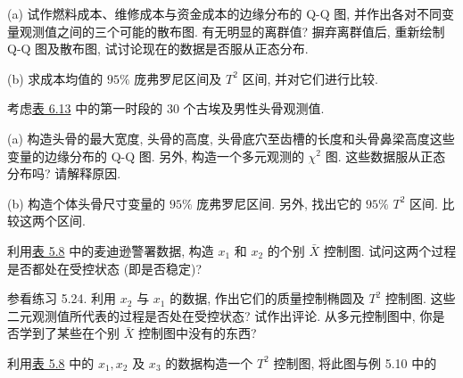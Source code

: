 \noindent (a) 试作燃料成本、维修成本与资金成本的边缘分布的 Q-Q 图, 并作出各对不同变量观测值之间的三个可能的散布图. 有无明显的离群值? 摒弃离群值后, 重新绘制 Q-Q 图及散布图, 试讨论现在的数据是否服从正态分布.

\noindent (b) 求成本均值的 $95\%$ 庞弗罗尼区间及 $T^{2}$ 区间, 并对它们进行比较.

\medskip
\noindent{}\quad 考虑\hyperref[tab:6.13]{表 6.13} 中的第一时段的 30 个古埃及男性头骨观测值.

\noindent (a) 构造头骨的最大宽度, 头骨的高度, 头骨底穴至齿槽的长度和头骨鼻梁高度这些变量的边缘分布的 Q-Q 图. 另外, 构造一个多元观测的 $\chi^{2}$ 图. 这些数据服从正态分布吗? 请解释原因.

\noindent (b) 构造个体头骨尺寸变量的 $95\%$ 庞弗罗尼区间. 另外, 找出它的 $95\%$ $T^{2}$ 区间. 比较这两个区间.

\medskip
\noindent{}\quad 利用\hyperref[tab:5.8]{表 5.8} 中的麦迪逊警署数据, 构造 $x_{1}$ 和 $x_{2}$ 的个别 $\bar{X}$ 控制图. 试问这两个过程是否都处在受控状态 (即是否稳定)?

\medskip
\noindent{}\quad 参看练习 5.24. 利用 $x_{2}$ 与 $x_{1}$ 的数据, 作出它们的质量控制椭圆及 $T^{2}$ 控制图. 这些二元观测值所代表的过程是否处在受控状态? 试作出评论. 从多元控制图中, 你是否学到了某些在个别 $\bar{X}$ 控制图中没有的东西?

\medskip
\noindent{}\quad 利用\hyperref[tab:5.8]{表 5.8} 中的 $x_{1},x_{2}$ 及 $x_{3}$ 的数据构造一个 $T^{2}$ 控制图, 将此图与例 5.10 中的
